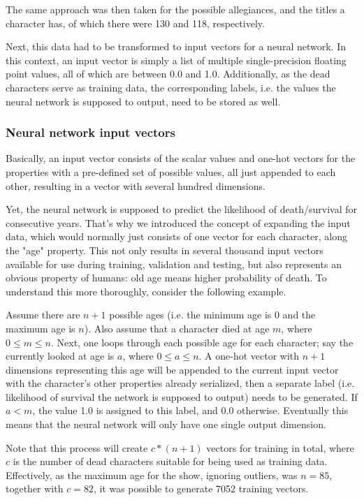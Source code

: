 \documentclass{bioinfo}
\begin{document}
The same approach was then taken for the possible allegiances, and the titles a character has, of which there were 130 and 118, respectively.

Next, this data had to be transformed to input vectors for a neural network. In this context, an input vector is simply a list of multiple single-precision floating point values, all of which are between 0.0 and 1.0. Additionally, as the dead characters serve as training data, the corresponding labels, i.e. the values the neural network is supposed to output, need to be stored as well.

\subsubsection{Neural network input vectors}

Basically, an input vector consists of the scalar values and one-hot vectors for the properties with a pre-defined set of possible values, all just appended to each other, resulting in a vector with several hundred dimensions.

Yet, the neural network is supposed to predict the likelihood of death/survival for consecutive years. That's why we introduced the concept of expanding the input data, which would normally just consists of one vector for each character, along the "age" property. This not only results in several thousand input vectors available for use during training, validation and testing, but also represents an obvious property of humans: old age means higher probability of death. To understand this more thoroughly, consider the following example.

Assume there are $n+1$ possible ages (i.e. the minimum age is $0$ and the maximum age is $n$). Also assume that a character died at age $m$, where $0\leq m\leq n$. Next, one loops through each possible age for each character; say the currently looked at age is $a$, where $0\leq a\leq n$. A one-hot vector with $n+1$ dimensions representing this age will be appended to the current input vector with the character's other properties already serialized, then a separate label (i.e. likelihood of survival the network is supposed to output) needs to be generated. If $a<m$, the value 1.0 is assigned to this label, and 0.0 otherwise. Eventually this means that the neural network will only have one single output dimension.

Note that this process will create $c*(n+1)$ vectors for training in total, where $c$ is the number of dead characters suitable for being used as training data. Effectively, as the maximum age for the show, ignoring outliers, was $n=85$, together with $c=82$, it was possible to generate 7052 training vectors.
\end{document}
